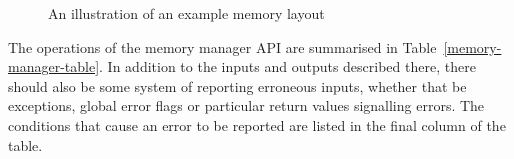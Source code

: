 \documentclass[a4paper,10pt]{report}
\begin{document}
\begin{figure}[ht]
  \centering
  \caption{An illustration of an example memory layout}
  \label{memory-fig}
\end{figure}

The operations of the memory manager API are summarised in
Table~\ref{memory-manager-table}.
In addition to the inputs and outputs described there, there should
also be some system of reporting erroneous inputs, whether that be
exceptions, global error flags or particular return values signalling
errors.
The conditions that cause an error to be reported are listed in the
final column of the table.
\end{document}
